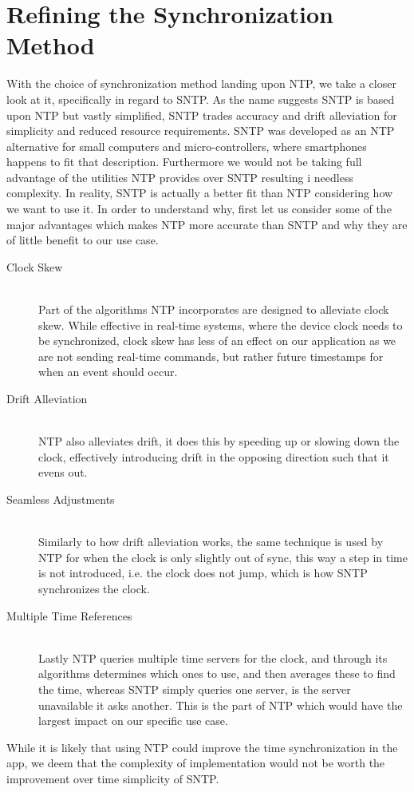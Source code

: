 \section{Refining the Synchronization Method}
With the choice of synchronization method landing upon \ac{NTP}, we take a closer look at it, specifically in regard to \ac{SNTP}.
As the name suggests \ac{SNTP} is based upon \ac{NTP} but vastly simplified, \ac{SNTP} trades accuracy and drift alleviation for simplicity and reduced resource requirements.
\ac{SNTP} was developed as an \ac{NTP} alternative for small computers and micro-controllers, where smartphones happens to fit that description.
Furthermore we would not be taking full advantage of the utilities \ac{NTP} provides over \ac{SNTP} resulting i needless complexity.
In reality, \ac{SNTP} is actually a better fit than \ac{NTP} considering how we want to use it. 
In order to understand why, first let us consider some of the major advantages which makes \ac{NTP} more accurate than \ac{SNTP} and why they are of little benefit to our use case.\cite{sntp_ntp}
\begin{description}
    \item [Clock Skew] \hfill \\
    Part of the algorithms \ac{NTP} incorporates are designed to alleviate clock skew.
    While effective in real-time systems, where the device clock needs to be synchronized, 
    clock skew has less of an effect on our application as we are not sending real-time commands, but rather future timestamps for when an event should occur.
    \item [Drift Alleviation] \hfill \\
    \ac{NTP} also alleviates drift, it does this by speeding up or slowing down the clock, effectively introducing drift in the opposing direction such that it evens out.
    \item [Seamless Adjustments] \hfill \\
    Similarly to how drift alleviation works, the same technique is used by \ac{NTP} for when the clock is only slightly out of sync, this way a step in time is not introduced, i.e. the clock does not jump, which is how \ac{SNTP} synchronizes the clock.
    \item [Multiple Time References] \hfill \\
    Lastly \ac{NTP} queries multiple time servers for the clock, and through its algorithms determines which ones to use, and then averages these to find the time, whereas \ac{SNTP} simply queries one server, is the server unavailable it asks another.
    This is the part of \ac{NTP} which would have the largest impact on our specific use case.
\end{description}

While it is likely that using \ac{NTP} could improve the time synchronization in the app, we deem that the complexity of implementation would not be worth the improvement over time simplicity of \ac{SNTP}.
